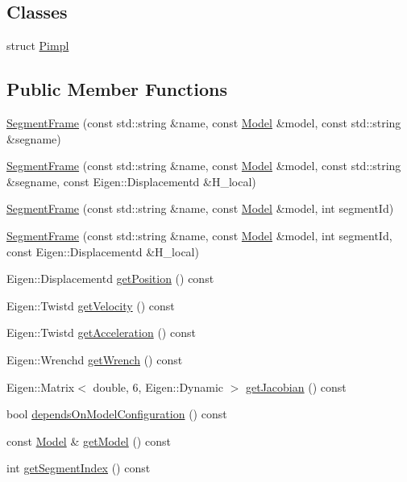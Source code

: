 \subsection*{Classes}
\begin{DoxyCompactItemize}
\item 
struct \hyperlink{structocra_1_1SegmentFrame_1_1Pimpl}{Pimpl}
\end{DoxyCompactItemize}
\subsection*{Public Member Functions}
\begin{DoxyCompactItemize}
\item 
\hyperlink{classocra_1_1SegmentFrame_ab05987e2ecc0f904c905b9e66269ce84}{Segment\+Frame} (const std\+::string \&name, const \hyperlink{classocra_1_1Model}{Model} \&model, const std\+::string \&segname)
\item 
\hyperlink{classocra_1_1SegmentFrame_ad9cd47c330239c77e913d38029af808d}{Segment\+Frame} (const std\+::string \&name, const \hyperlink{classocra_1_1Model}{Model} \&model, const std\+::string \&segname, const Eigen\+::\+Displacementd \&H\+\_\+local)
\item 
\hyperlink{classocra_1_1SegmentFrame_a01156da94eca5bf4961077a3310fc271}{Segment\+Frame} (const std\+::string \&name, const \hyperlink{classocra_1_1Model}{Model} \&model, int segment\+Id)
\item 
\hyperlink{classocra_1_1SegmentFrame_a3864bc8263c40f7afa11de3c8c2dd76b}{Segment\+Frame} (const std\+::string \&name, const \hyperlink{classocra_1_1Model}{Model} \&model, int segment\+Id, const Eigen\+::\+Displacementd \&H\+\_\+local)
\item 
Eigen\+::\+Displacementd \hyperlink{classocra_1_1SegmentFrame_ad0c5aa3b15b384cd5a4774ddd534b32e}{get\+Position} () const
\item 
Eigen\+::\+Twistd \hyperlink{classocra_1_1SegmentFrame_a6a45d4901408704ead9bbd1f5b99a666}{get\+Velocity} () const
\item 
Eigen\+::\+Twistd \hyperlink{classocra_1_1SegmentFrame_aa8f7f9544b59da591d94ac8e6a8a9e5d}{get\+Acceleration} () const
\item 
Eigen\+::\+Wrenchd \hyperlink{classocra_1_1SegmentFrame_a47bebcb9817083395ab034fe8fb72a19}{get\+Wrench} () const
\item 
Eigen\+::\+Matrix$<$ double, 6, Eigen\+::\+Dynamic $>$ \hyperlink{classocra_1_1SegmentFrame_a1ece38dd51a3331dfe3de7911ad9291e}{get\+Jacobian} () const
\item 
bool \hyperlink{classocra_1_1SegmentFrame_a68708b5ced24d192fbb0bfd9e3647925}{depends\+On\+Model\+Configuration} () const
\item 
const \hyperlink{classocra_1_1Model}{Model} \& \hyperlink{classocra_1_1SegmentFrame_a3a14b77753ad98507db9968b33c582e4}{get\+Model} () const
\item 
int \hyperlink{classocra_1_1SegmentFrame_a8f651dccb13afc25504531efd17c8eef}{get\+Segment\+Index} () const
\end{DoxyCompactItemize}
